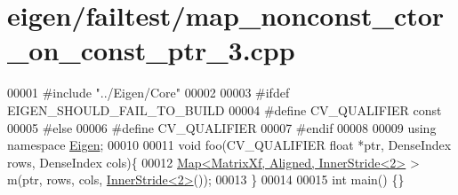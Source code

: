 \hypertarget{eigen_2failtest_2map__nonconst__ctor__on__const__ptr__3_8cpp_source}{}\section{eigen/failtest/map\+\_\+nonconst\+\_\+ctor\+\_\+on\+\_\+const\+\_\+ptr\+\_\+3.cpp}
\label{eigen_2failtest_2map__nonconst__ctor__on__const__ptr__3_8cpp_source}

\begin{DoxyCode}
00001 \textcolor{preprocessor}{#include "../Eigen/Core"}
00002 
00003 \textcolor{preprocessor}{#ifdef EIGEN\_SHOULD\_FAIL\_TO\_BUILD}
00004 \textcolor{preprocessor}{#define CV\_QUALIFIER const}
00005 \textcolor{preprocessor}{#else}
00006 \textcolor{preprocessor}{#define CV\_QUALIFIER}
00007 \textcolor{preprocessor}{#endif}
00008 
00009 \textcolor{keyword}{using namespace }\hyperlink{namespace_eigen}{Eigen};
00010 
00011 \textcolor{keywordtype}{void} foo(CV\_QUALIFIER \textcolor{keywordtype}{float} *ptr, DenseIndex rows, DenseIndex cols)\{
00012     \hyperlink{group___core___module_class_eigen_1_1_map}{Map<MatrixXf, Aligned, InnerStride<2>} > m(ptr, rows, cols, 
      \hyperlink{class_eigen_1_1_inner_stride}{InnerStride<2>}());
00013 \}
00014 
00015 \textcolor{keywordtype}{int} main() \{\}
\end{DoxyCode}
